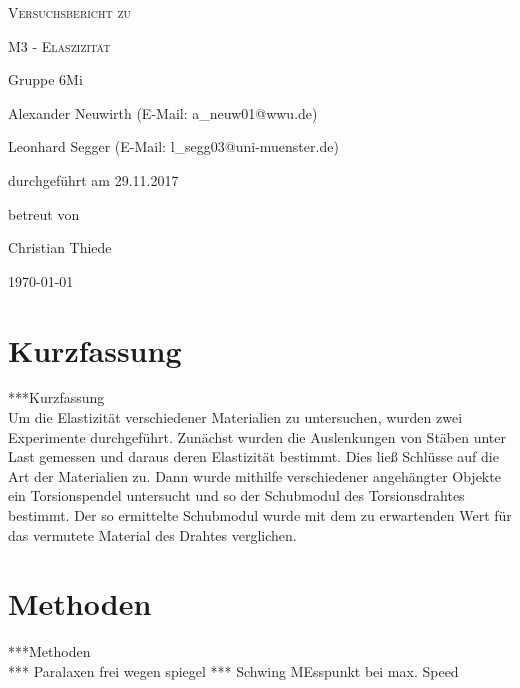 \documentclass[
	a4paper,
	12pt,
	pagesize,
	ngerman
]{scrartcl}
\begin{document}
	
	\begin{titlepage}
		\centering
		{\scshape\LARGE Versuchsbericht zu \par}
		\vspace{1cm}
		{\scshape\huge M3 - Elaszizität\par}
		\vspace{2.5cm}
		{\LARGE Gruppe 6Mi \par}
		\vspace{0.5cm}
		
		{\large Alexander Neuwirth (E-Mail: a\_neuw01@wwu.de) \par}
		{\large Leonhard Segger (E-Mail: l\_segg03@uni-muenster.de) \par}
		\vfill
		
		durchgeführt am 29.11.2017\par
		betreut von\par
		{\large Christian Thiede}
		
		\vfill
		
		{\large \today\par}
	\end{titlepage}
	\tableofcontents
	\newpage
	
	\section{Kurzfassung}
	***Kurzfassung\\
	Um die Elastizität verschiedener Materialien zu untersuchen, wurden zwei Experimente durchgeführt. Zunächst wurden die Auslenkungen von Stäben unter Last gemessen und daraus deren Elastizität bestimmt. Dies ließ Schlüsse auf die Art der Materialien zu. Dann wurde mithilfe verschiedener angehängter Objekte ein Torsionspendel untersucht und so der Schubmodul des Torsionsdrahtes bestimmt.  %
	Der so ermittelte Schubmodul wurde mit dem zu erwartenden Wert für das vermutete Material des Drahtes verglichen.

	\section{Methoden}
	***Methoden \\
	*** Paralaxen frei wegen spiegel
	*** Schwing MEsspunkt bei max. Speed
	
\end{document}
